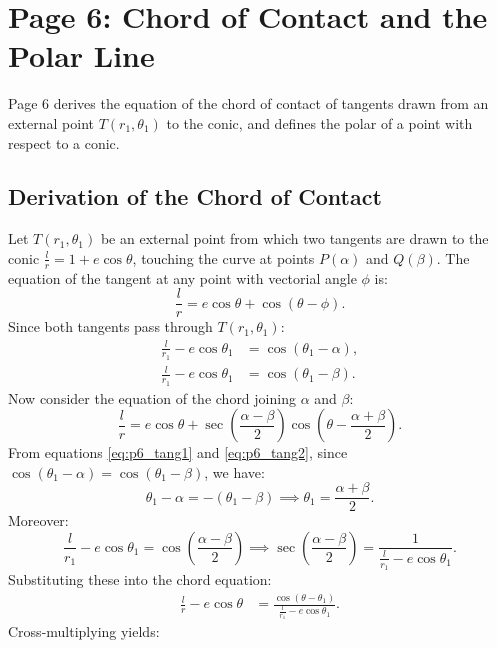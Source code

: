 \section{Page 6: Chord of Contact and the Polar Line}
\label{sec:page06}

\begin{conceptbox}
Page 6 derives the equation of the chord of contact of tangents drawn from an external point $T(r_1, \theta_1)$ to the conic, and defines the polar of a point with respect to a conic.
\end{conceptbox}

\subsection{Derivation of the Chord of Contact}
Let $T(r_1, \theta_1)$ be an external point from which two tangents are drawn to the conic $\frac{l}{r} = 1 + e\cos\theta$, touching the curve at points $P(\alpha)$ and $Q(\beta)$.
The equation of the tangent at any point with vectorial angle $\phi$ is:
\begin{equation}
    \frac{l}{r} = e\cos\theta + \cos(\theta - \phi).
\end{equation}
Since both tangents pass through $T(r_1, \theta_1)$:
\begin{align}
    \frac{l}{r_1} - e\cos\theta_1 &= \cos(\theta_1 - \alpha), \label{eq:p6_tang1}\\
    \frac{l}{r_1} - e\cos\theta_1 &= \cos(\theta_1 - \beta). \label{eq:p6_tang2}
\end{align}
Now consider the equation of the chord joining $\alpha$ and $\beta$:
\begin{equation}
    \frac{l}{r} = e\cos\theta + \sec\left(\frac{\alpha - \beta}{2}\right)\cos\left(\theta - \frac{\alpha + \beta}{2}\right).
\end{equation}
From equations \eqref{eq:p6_tang1} and \eqref{eq:p6_tang2}, since $\cos(\theta_1 - \alpha) = \cos(\theta_1 - \beta)$, we have:
\begin{equation}
    \theta_1 - \alpha = -(\theta_1 - \beta) \implies \theta_1 = \frac{\alpha + \beta}{2}.
\end{equation}
Moreover:
\begin{equation}
    \frac{l}{r_1} - e\cos\theta_1 = \cos\left(\frac{\alpha - \beta}{2}\right) \implies \sec\left(\frac{\alpha - \beta}{2}\right) = \frac{1}{\frac{l}{r_1} - e\cos\theta_1}.
\end{equation}
Substituting these into the chord equation:
\begin{align}
    \frac{l}{r} - e\cos\theta &= \frac{\cos(\theta - \theta_1)}{\frac{l}{r_1} - e\cos\theta_1}.
\end{align}
Cross-multiplying yields:

